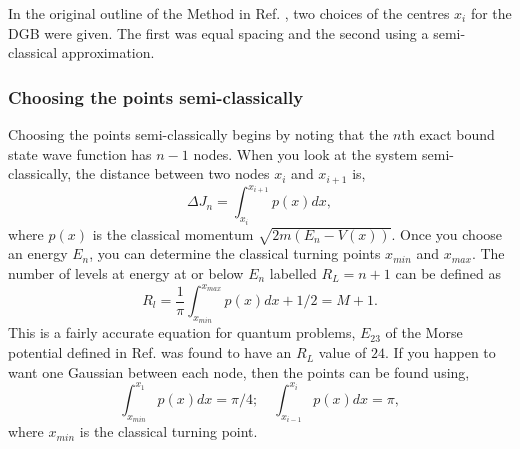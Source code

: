 {  In the original outline of the Method in Ref. , two choices of the centres $x_i$ for the DGB were given.  The first was equal spacing and the second using a semi-classical approximation. 



\subsubsection{Choosing the points semi-classically}
Choosing the points semi-classically begins by noting that the $n$th exact bound state wave function has $n-1$ nodes.  When you look at the system semi-classically, the distance between two nodes $x_i$ and $x_{i+1}$ is,
\begin{equation}
\label{eq.b3}
\Delta J_n=\int_{x_i}^{x_{i+1}}p\left(x\right)dx,
\end{equation}
where $p\left(x\right)$ is the classical momentum $\sqrt{2m\left(E_n-V\left(x\right)\right)}$. Once you choose an energy $E_n$, you can determine the classical turning points $x_{min}$ and $x_{max}$. The number of levels at energy at or below $E_n$ labelled $R_L=n+1$ can be defined as
 \begin{equation}
\label{eq.b5}
R_l=\dfrac{1}{\pi}
\int^{x_{max}}_{x_{min}}p\left(x\right) dx+1/2 =M+1. 
 \end{equation}
This is a fairly accurate equation for quantum problems, $E_{23}$ of the Morse potential defined in Ref.  was found to have an $R_L$ value of $24$.  If you happen to want one Gaussian between each node, then the points can be found using,
\begin{equation}
\label{eq.pg}
\int^{x_1}_{x_{min}}p\left(x\right) dx =\pi/4; \quad
 \int^{x_i}_{x_{i-1}}p\left(x\right) dx =\pi,
 \end{equation}
where $x_{min}$ is the classical turning point. 
 
}
